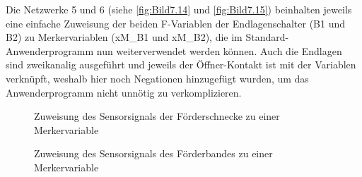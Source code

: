 Die Netzwerke 5 und 6 (siehe \autoref{fig:Bild7.14} und \autoref{fig:Bild7.15}) beinhalten jeweils eine einfache Zuweisung der beiden F-Variablen der Endlagenschalter (B1 und B2) zu Merkervariablen (xM\_B1 und xM\_B2), die im Standard- Anwenderprogramm nun weiterverwendet werden können. Auch die Endlagen sind zweikanalig ausgeführt und jeweils der Öffner-Kontakt ist mit der Variablen verknüpft, weshalb hier noch Negationen hinzugefügt wurden, um das Anwenderprogramm nicht unnötig zu verkomplizieren.

\begin{figure}[H]
   \centering
   \caption[Merker Endlage Förderschnecke]{Zuweisung des Sensorsignals der Förderschnecke zu einer Merkervariable}
   \label{fig:Bild7.14}
\end{figure}

\begin{figure}[H]
   \centering
   \caption[Merker Endlage Förderband]{Zuweisung des Sensorsignals des Förderbandes zu einer Merkervariable}
   \label{fig:Bild7.15}
\end{figure}

